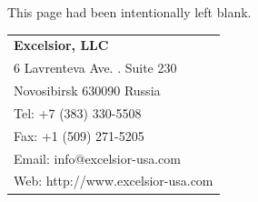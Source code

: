 \ifonline\else

\cleardoublepage
\thispagestyle{empty}
\vspace*{\fill}
\begin{center}This page had been intentionally left blank.\end{center}
\vspace*{\fill}
\pagebreak
\thispagestyle{empty}
\vspace*{\fill}
\begin{flushright}
\begin{tabular}{|l}
\bf Excelsior, LLC \\
6 Lavrenteva Ave. . Suite 230 \\
Novosibirsk 630090 Russia \\
Tel: +7 (383) 330-5508 \\
Fax: +1 (509) 271-5205 \\
Email: info@excelsior-usa.com \\
Web: http://www.excelsior-usa.com \\
\end{tabular}
\end{flushright}

\fi